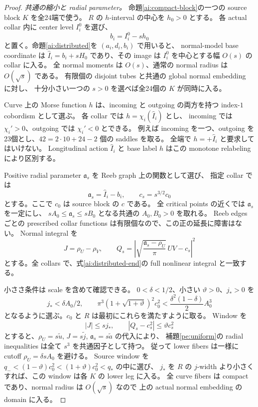 \begin{proof}
\emph{共通の縮小と radial parameter。}
命題\ref{ai:compact-block}の一つの source block $K$ を全24端で使う。
$R$ の $h$-interval の中心を $h_0>0$ とする。
各 actual collar 内に center level $I_i^0$ を選び、
\begin{equation}\label{ai:offsets}
 b_i=I_i^0-sh_0
\end{equation}
と置く。命題\ref{ai:distributed}を $(a_i,d_i,b_i)$ で用いると、
normal-model base coordinate は
$\widehat I_i=b_i+sH_0$ であり、その image は $I_i^0$ を中心とする幅 $O(s)$ の collar に入る。
全 normal moments は $O(s)$、通常の normal radius は $O(\sqrt{s})$ である。
有限個の disjoint tubes と共通の global normal embedding に対し、
十分小さい一つの $s>0$ を選べば全24個の $K$ が同時に入る。

Curve 上の Morse function $h$ は、incoming と outgoing の両方を持つ index-$1$ cobordism として選ぶ。
各 collar では $h=\chi_i(\widehat I_i)$ とし、
incoming では $\chi_i'>0$、outgoing では $\chi_i'<0$ とできる。
例えば incoming を一つ、outgoing を23個とし、$42=2\cdot10+24-2$ 個の saddles を取る。
全端で $h=+\widehat I_i$ と要求してはいけない。
Longitudinal action $\widehat I_i$ と base label $h$ はこの monotone relabeling により区別する。

Positive radial parameter $\mathfrak a_s$ を Reeb graph 上の関数として選び、
指定 collar では
\[
 \mathfrak a_s=\widehat I_i-b_i,
 \qquad c_s=s^{3/2}c_0
\]
とする。ここで $c_0$ は source block の $c$ である。
全 critical points の近くでは $\mathfrak a_s$ を一定にし、
$sA_0\le\mathfrak a_s\le sB_0$ となる共通の $A_0,B_0>0$ を取れる。
Reeb edges ごとの prescribed collar functions は有限個なので、この正の延長に障害はない。
Normal integral を
\[
 J=\rho_U-\rho_V,\qquad
 Q_s=\left|\sqrt{\frac{\mathfrak a_s-\rho_U}{\pi}}\,UV-c_s\right|^2
\]
とする。全 collars で、式\eqref{ai:distributed-end}の full nonlinear integral と一致する。

小ささ条件は scale を含めて確認できる。
$0<\delta<1/2$、小さい $\vartheta>0$、$j_*>0$ を
\[
 j_*<\delta A_0/2,\qquad
 \pi^3(1+\sqrt{1+\vartheta})^2c_0^2
 <\frac{\delta^2(1-\delta)}2A_0^3
\]
となるように選ぶ。$c_0$ と $R$ は最初にこれらを満たすように取る。
Window を
\[
 |J|\le s j_*,\qquad |Q_s-c_s^2|\le\vartheta c_s^2
\]
とすると、$\rho_U=s\tilde u$, $J=s\tilde j$, $\mathfrak a_s=s\tilde a$ の代入により、
補題\ref{pe:uniform}の radial inequalities は全て $s^3$ を共通因子として持つ。
従って lower fibers は一様に cutoff $\rho_U=\delta sA_0$ を避ける。
Source window を $q_-< (1-\vartheta)c_0^2<(1+\vartheta)c_0^2<q_*$ の中に選び、
$j_*$ を $R$ の $j$-width より小さくすれば、この window は各 $K$ の lower leg に入る。
全 curve fibers は compact であり、normal radius は $O(\sqrt{s})$ なので
上の actual normal embedding の domain に入る。


\end{proof}
